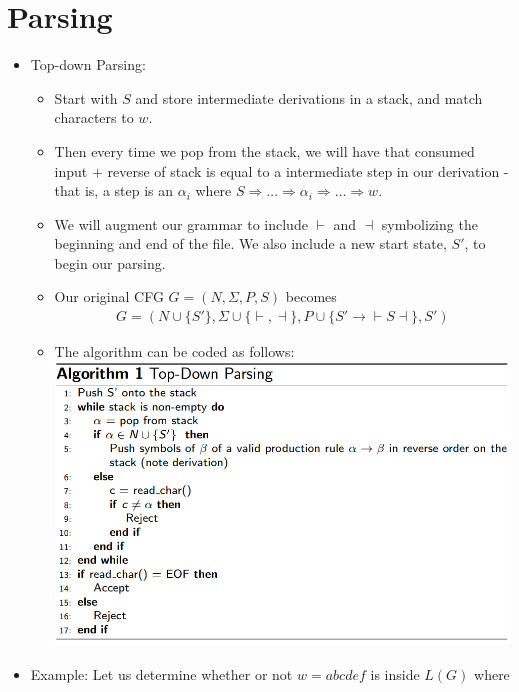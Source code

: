 \documentclass[12pt]{article}
\begin{document}
\section{Parsing}
\begin{itemize}
    \item Top-down Parsing:
        \begin{itemize}
            \item Start with $S$ and store intermediate derivations in a stack, and match characters to $w$.
            \item Then every time we pop from the stack, we will have that consumed input $+$ reverse of stack is equal to a intermediate step in our derivation - that is, a step is an $\alpha_i$ where $S \Rightarrow \dots \Rightarrow \alpha_i \Rightarrow \dots \Rightarrow w$.
            \item We will augment our grammar to include $\vdash$ and $\dashv$ symbolizing the beginning and end of the file.  We also include a new start state, $S'$, to begin our parsing.
            \item Our original CFG $G = (N, \Sigma, P, S)$ becomes
                \begin{align*}
                G = (N \cup \{S'\}, \Sigma \cup \{\vdash, \dashv\}, P \cup \{S' \rightarrow \vdash S \dashv\}, S')
                \end{align*}
            \item The algorithm can be coded as follows: \\
                \includegraphics[scale=0.4]{tdparse.png}
        \end{itemize}
        \newpage
    \item Example: Let us determine whether or not $w = abcdef$ is inside $L(G)$ where 

\end{itemize}
\end{document}
